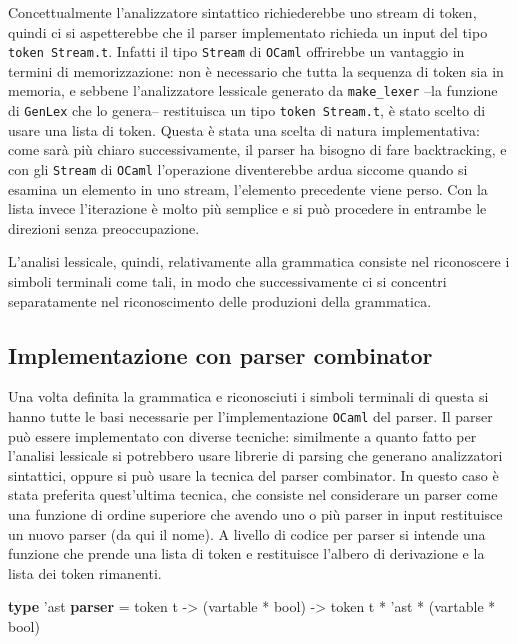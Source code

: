 \documentclass[]{article}
\newenvironment{Shaded}{}{}
\newcommand{\DataTypeTok}[1]{\textcolor[rgb]{0.56,0.13,0.00}{#1}}
\newcommand{\KeywordTok}[1]{\textcolor[rgb]{0.00,0.44,0.13}{\textbf{#1}}}
\newcommand{\NormalTok}[1]{#1}
\begin{document}
Concettualmente l'analizzatore sintattico richiederebbe uno stream di
token, quindi ci si aspetterebbe che il parser implementato richieda un
input del tipo \texttt{token\ Stream.t}. Infatti il tipo \texttt{Stream}
di \texttt{OCaml} offrirebbe un vantaggio in termini di memorizzazione:
non è necessario che tutta la sequenza di token sia in memoria, e
sebbene l'analizzatore lessicale generato da \texttt{make\_lexer} --la
funzione di \texttt{GenLex} che lo genera-- restituisca un tipo
\texttt{token\ Stream.t}, è stato scelto di usare una lista di token.
Questa è stata una scelta di natura implementativa: come sarà più chiaro
successivamente, il parser ha bisogno di fare backtracking, e con gli
\texttt{Stream} di \texttt{OCaml} l'operazione diventerebbe ardua
siccome quando si esamina un elemento in uno stream, l'elemento
precedente viene perso. Con la lista invece l'iterazione è molto più
semplice e si può procedere in entrambe le direzioni senza
preoccupazione.

L'analisi lessicale, quindi, relativamente alla grammatica consiste nel
riconoscere i simboli terminali come tali, in modo che successivamente
ci si concentri separatamente nel riconoscimento delle produzioni della
grammatica.

\hypertarget{implementazione-con-parser-combinator}{%
\subsection{Implementazione con parser
combinator}\label{implementazione-con-parser-combinator}}

Una volta definita la grammatica e riconosciuti i simboli terminali di
questa si hanno tutte le basi necessarie per l'implementazione
\texttt{OCaml} del parser. Il parser può essere implementato con diverse
tecniche: similmente a quanto fatto per l'analisi lessicale si
potrebbero usare librerie di parsing che generano analizzatori
sintattici, oppure si può usare la tecnica del parser combinator. In
questo caso è stata preferita quest'ultima tecnica, che consiste nel
considerare un parser come una funzione di ordine superiore che avendo
uno o più parser in input restituisce un nuovo parser (da qui il nome).
A livello di codice per parser si intende una funzione che prende una
lista di token e restituisce l'albero di derivazione e la lista dei
token rimanenti.

\begin{Shaded}
\begin{Highlighting}[]
\KeywordTok{type}\NormalTok{ 'ast }\KeywordTok{parser}\NormalTok{ = }
\NormalTok{token t -> (vartable * }\DataTypeTok{bool}\NormalTok{) -> token t * 'ast * (vartable * }\DataTypeTok{bool}\NormalTok{)}
\end{Highlighting}
\end{Shaded}
\end{document}
